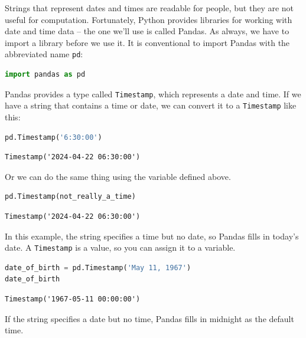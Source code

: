 Strings that represent dates and times are readable for people, but they
are not useful for computation. Fortunately, Python provides libraries
for working with date and time data -- the one we'll use is called
Pandas. As always, we have to import a library before we use it. It is
conventional to import Pandas with the abbreviated name
\passthrough{\lstinline!pd!}:

\begin{lstlisting}[language=Python,style=source]
import pandas as pd
\end{lstlisting}

Pandas provides a type called \passthrough{\lstinline!Timestamp!}, which
represents a date and time. If we have a string that contains a time or
date, we can convert it to a \passthrough{\lstinline!Timestamp!} like
this:

\begin{lstlisting}[language=Python,style=source]
pd.Timestamp('6:30:00')
\end{lstlisting}

\begin{lstlisting}[style=output]
Timestamp('2024-04-22 06:30:00')
\end{lstlisting}

Or we can do the same thing using the variable defined above.

\begin{lstlisting}[language=Python,style=source]
pd.Timestamp(not_really_a_time)
\end{lstlisting}

\begin{lstlisting}[style=output]
Timestamp('2024-04-22 06:30:00')
\end{lstlisting}

In this example, the string specifies a time but no date, so Pandas
fills in today's date. A \passthrough{\lstinline!Timestamp!} is a value,
so you can assign it to a variable.

\begin{lstlisting}[language=Python,style=source]
date_of_birth = pd.Timestamp('May 11, 1967')
date_of_birth
\end{lstlisting}

\begin{lstlisting}[style=output]
Timestamp('1967-05-11 00:00:00')
\end{lstlisting}

If the string specifies a date but no time, Pandas fills in midnight as
the default time.

